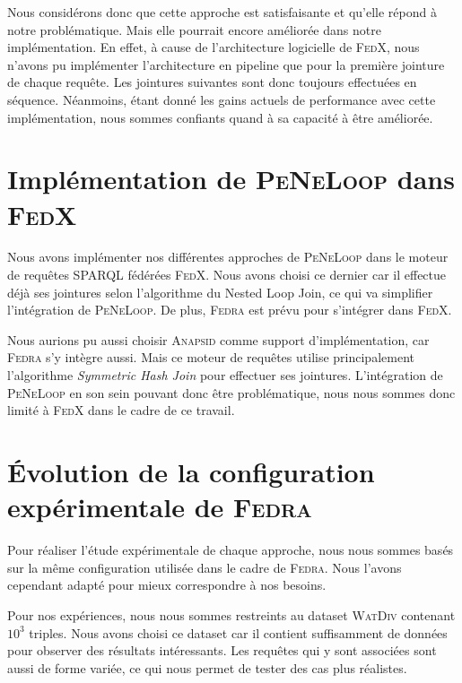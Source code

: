 \documentclass[a4paper]{article}
\def\sparql{\textsc{SPARQL}\xspace}
\def\fedra{\textsc{Fedra}\xspace}
\def\fedx{\textsc{FedX}\xspace}
\def\peneloop{\textsc{PeNeLoop}\xspace}
\begin{document}
Nous considérons donc que cette approche est satisfaisante et qu'elle répond à notre problématique. Mais elle pourrait encore améliorée dans notre implémentation. En effet, à cause de l'architecture logicielle de \fedx, nous n'avons pu implémenter l'architecture en pipeline que pour la première jointure de chaque requête. Les jointures suivantes sont donc toujours effectuées en séquence. Néanmoins, étant donné les gains actuels de performance avec cette implémentation, nous sommes confiants quand à sa capacité à être améliorée.

\section{Implémentation de \peneloop dans \fedx}

Nous avons implémenter nos différentes approches de \peneloop dans le moteur de requêtes \sparql fédérées \fedx. Nous avons choisi ce dernier car il effectue déjà ses jointures selon l'algorithme du Nested Loop Join, ce qui va simplifier l'intégration de \peneloop. De plus, \fedra est prévu pour s'intégrer dans \fedx.

Nous aurions pu aussi choisir \textsc{Anapsid} \cite{acosta2011anapsid} comme support d'implémentation, car \fedra s'y intègre aussi. Mais ce moteur de requêtes utilise principalement l'algorithme \textit{Symmetric Hash Join} pour effectuer ses jointures. L'intégration de \peneloop en son sein pouvant donc être problématique, nous nous sommes donc limité à \fedx dans le cadre de ce travail.

\section{Évolution de la configuration expérimentale de \fedra}\label{sec:setup}

Pour réaliser l'étude expérimentale de chaque approche, nous nous sommes basés sur la même configuration utilisée dans le cadre de \fedra \cite{montoya2014fedra}. Nous l'avons cependant adapté pour mieux correspondre à nos besoins.

Pour nos expériences, nous nous sommes restreints au dataset \textsc{WatDiv} contenant $10^3$ triples. Nous avons choisi ce dataset car il contient suffisamment de données pour observer des résultats intéressants. Les requêtes qui y sont associées sont aussi de forme variée, ce qui nous permet de tester des cas plus réalistes.
\end{document}
